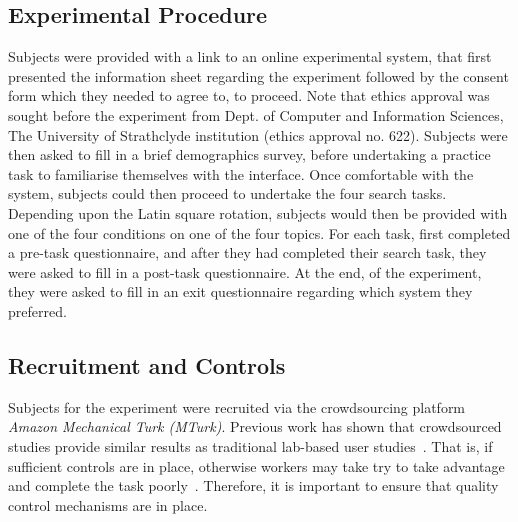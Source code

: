 
\subsection{Experimental Procedure}
Subjects were provided with a link to an online experimental system, that first presented the information sheet regarding the experiment followed by the consent form which they needed to agree to, to proceed. Note that ethics approval was sought before the experiment from Dept. of Computer and Information Sciences, The University of Strathclyde institution (ethics approval no. 622). Subjects were then asked to fill in a brief demographics survey, before undertaking a practice task to familiarise themselves with the interface. Once comfortable with the system, subjects could then proceed to undertake the four search tasks. Depending upon the Latin square rotation, subjects would then be provided with one of the four conditions on one of the four topics. For each task, first completed a pre-task questionnaire, and after they had completed their search task, they were asked to fill in a post-task questionnaire. At the end, of the experiment, they were asked to fill in an exit questionnaire regarding which system they preferred.



\subsection{Recruitment and Controls}\label{sec:method:subjects}
Subjects for the experiment were recruited via the crowdsourcing platform \emph{Amazon Mechanical Turk (MTurk)}. Previous work has shown that crowdsourced studies provide similar results as traditional lab-based user studies~\cite{kelly2011remote,zuccon2013crowdsourcing}. That is, if sufficient controls are in place, otherwise workers may take try to take advantage and complete the task poorly~\cite{feild2010turkers,bota2016playing_your_cards}. Therefore, it is important to ensure that quality control mechanisms are in place. 

